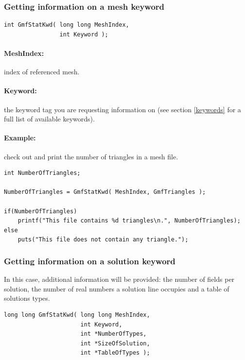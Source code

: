 \documentclass[a4paper,12pt]{article}
\begin{document}
\subsubsection{Getting information on a mesh keyword}

\begin{tt}
\begin{verbatim}
int GmfStatKwd( long long MeshIndex,
                int Keyword );
\end{verbatim}
\end{tt}
\normalfont

\paragraph{MeshIndex:} index of referenced mesh.

\paragraph{Keyword:} the keyword tag you are requesting information on (see section \ref{keywords} for a full list of available keywords).

\paragraph{Example:} check out and print the number of triangles in a mesh file.

\begin{tt}
\begin{verbatim}
int NumberOfTriangles;

NumberOfTriangles = GmfStatKwd( MeshIndex, GmfTriangles );

if(NumberOfTriangles)
    printf("This file contains %d triangles\n.", NumberOfTriangles);
else
    puts("This file does not contain any triangle.");
\end{verbatim}
\end{tt}
\normalfont

\subsubsection{Getting information on a solution keyword}
In this case, additional information will be provided: the number of fields per solution, the number of real numbers a solution line occupies and a table of solutions types.

\begin{tt}
\begin{verbatim}
long long GmfStatKwd( long long MeshIndex,
                      int Keyword,
                      int *NumberOfTypes,
                      int *SizeOfSolution,
                      int *TableOfTypes );
\end{verbatim}
\end{tt}
\normalfont
\end{document}
